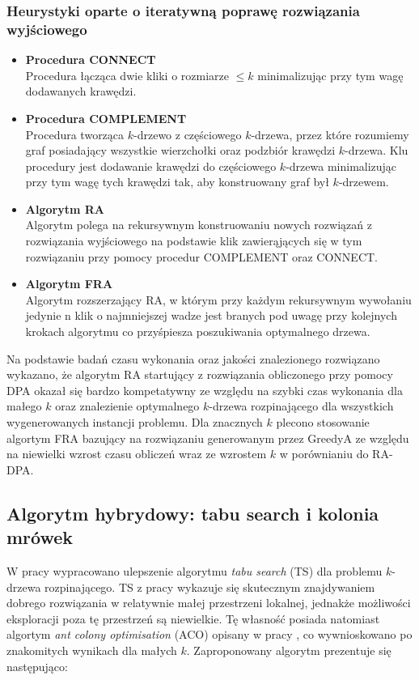 \documentclass[12pt]{article}
\begin{document}
\subsubsection{Heurystyki oparte o iteratywną poprawę rozwiązania wyjściowego}

\begin{itemize}
  \item \textbf{Procedura CONNECT}\\
        Procedura łącząca dwie kliki o rozmiarze $\leq k$ minimalizując przy tym wagę dodawanych krawędzi.
  \item \textbf{Procedura COMPLEMENT}\\
        Procedura tworząca $k$-drzewo z częściowego $k$-drzewa, przez które rozumiemy graf posiadający wszystkie wierzchołki oraz podzbiór krawędzi $k$-drzewa. Klu procedury jest dodawanie krawędzi do częściowego $k$-drzewa minimalizując przy tym wagę tych krawędzi tak, aby konstruowany graf był $k$-drzewem.
  \item \textbf{Algorytm RA}\\
        Algorytm polega na rekursywnym konstruowaniu nowych rozwiązań z rozwiązania wyjściowego na podstawie klik zawierąjących się w tym rozwiązaniu przy pomocy procedur COMPLEMENT oraz CONNECT.
  \item \textbf{Algorytm FRA}\\
        Algorytm rozszerzający RA, w którym przy każdym rekursywnym wywołaniu jedynie n klik o najmniejszej wadze jest branych pod uwagę przy kolejnych krokach algorytmu co przyśpiesza poszukiwania optymalnego drzewa.
\end{itemize}

Na podstawie badań czasu wykonania oraz jakości znalezionego rozwiązano wykazano, że algorytm RA startujący z rozwiązania obliczonego przy pomocy DPA okazał się bardzo kompetatywny ze względu na szybki czas wykonania dla małego $k$ oraz znalezienie optymalnego $k$-drzewa rozpinającego dla wszystkich wygenerowanych instancji problemu. Dla znacznych $k$ plecono stosowanie algortym FRA bazujący na rozwiązaniu generowanym przez GreedyA ze względu na niewielki wzrost czasu obliczeń wraz ze wzrostem $k$ w porównianiu do RA-DPA.

\subsection{Algorytm hybrydowy: tabu search i kolonia mrówek}

W pracy \cite{tabu_search} wypracowano ulepszenie algorytmu \textit{tabu search} (TS) dla problemu $k$-drzewa rozpinającego. TS z pracy \cite{tabu_search} wykazuje się skutecznym znajdywaniem dobrego rozwiązania w relatywnie małej przestrzeni lokalnej, jednakże możliwości eksploracji poza tę przestrzeń są niewielkie. Tę własność posiada natomiast algortym \textit{ant colony optimisation} (ACO) opisany w pracy \cite{metaheuristic}, co wywnioskowano po znakomitych wynikach dla małych $k$.
Zaproponowany algorytm prezentuje się następująco:
\end{document}
